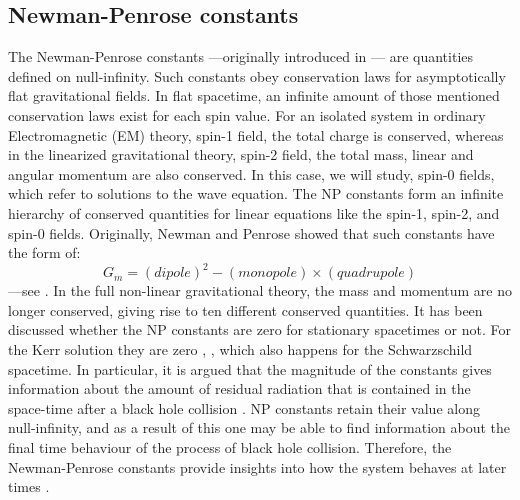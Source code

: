 \documentclass[
11pt, %
english, %
singlespacing, %
headsepline, %
]{MastersDoctoralThesis} %
\begin{document}
\subsection{Newman-Penrose constants}
The Newman-Penrose constants ---originally introduced in
\cite{NewPen68}--- are quantities defined on null-infinity. Such
constants obey conservation laws for asymptotically flat
gravitational fields. In flat spacetime, an infinite amount of those
mentioned conservation laws exist for each spin value.
For an
isolated system in ordinary Electromagnetic (EM) theory, spin-1 field,
the total charge is conserved, whereas in the linearized gravitational
theory, spin-2 field, the total mass, linear and angular momentum are
also conserved. In this case, we will study, spin-0 fields, which refer
to solutions to the wave equation.  The NP constants form an infinite hierarchy of
conserved quantities for linear equations like the spin-1, spin-2, and
spin-0 fields. Originally, Newman and Penrose showed that such
constants have the form of:
$$G_m = (dipole)^2 - (monopole) \times (quadrupole)$$ ---see
\cite{DaiVal02}.  In the full non-linear gravitational theory, the
mass and momentum are no longer conserved, giving rise to ten
different conserved quantities. It has been discussed whether the NP
constants are zero for stationary spacetimes or not. For the Kerr
solution they are zero \cite{Bac10}, \cite{BaiZhoGonXueXiaoLau07},
which also happens for the Schwarzschild spacetime.
In particular,
it is argued that the magnitude of the constants gives information
about the amount of residual radiation that is contained in the
space-time after a black hole collision \cite{DaiVal02}.  NP constants
retain their value along null-infinity, and as a result of this one
may be able to find information about the final time behaviour of the
process of black hole collision.
Therefore, the Newman-Penrose
constants provide insights into how the system behaves at later times
\cite{DaiVal02}.

\end{document}
